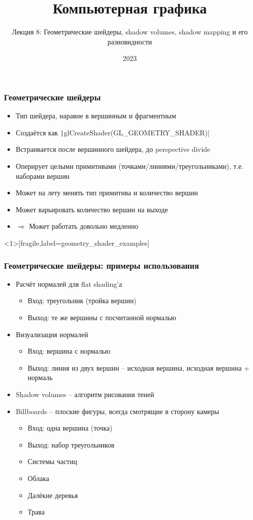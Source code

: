 \documentclass{beamer}
\title{Компьютерная графика}
\subtitle{Лекция 8: Геометрические шейдеры, shadow volumes, shadow mapping и его разновидности}
\date{2023}
\begin{document}

\frame{\titlepage}

\begin{frame}[fragile]
\frametitle{Геометрические шейдеры}
\begin{itemize}
\item Тип шейдера, наравне в вершинным и фрагментным
\pause
\item Создаётся как \texttt|glCreateShader(GL_GEOMETRY_SHADER)|
\pause
\item Встраивается после вершинного шейдера, до perspective divide
\pause
\item Оперирует целыми примитивами (точками/линиями/треугольниками), т.е. наборами вершин
\pause
\item Может на лету менять тип примитива и количество вершин
\pause
\item Может варьировать количество вершин на выходе
\pause
\item \begin{math}\Longrightarrow\end{math} Может работать довольно медленно
\end{itemize}
\end{frame}

\begin{frame}<1>[fragile,label=geometry_shader_examples]
\frametitle{Геометрические шейдеры: примеры использования}
\fontsize{10pt}{10pt}
\begin{itemize}
\item Расчёт нормалей для flat shading'а
\pause
\begin{itemize}
\item Вход: треугольник (тройка вершин)
\item Выход: те же вершины с посчитанной нормалью
\end{itemize}
\pause
\item Визуализация нормалей
\pause
\begin{itemize}
\item Вход: вершина с нормалью
\item Выход: линия из двух вершин -- исходная вершина, исходная вершина + нормаль
\end{itemize}
\pause
\item Shadow volumes -- алгоритм рисования теней
\pause
\item Billboards -- плоские фигуры, всегда смотрящие в сторону камеры
\pause
\begin{itemize}
\item Вход: одна вершина (точка)
\item Выход: набор треугольников
\pause
\item Системы частиц
\pause
\item Облака
\pause
\item Далёкие деревья
\pause
\item Трава
\end{itemize}
\end{itemize}
\end{frame}
\end{document}
